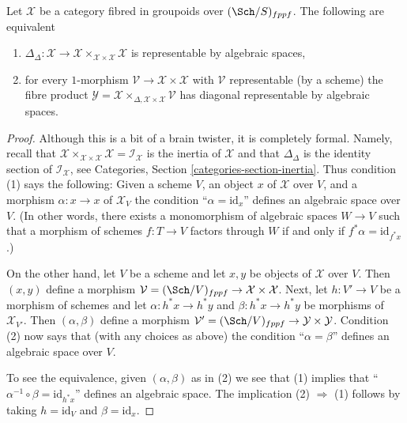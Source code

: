 \begin{lemma}
\label{lemma-second-diagonal}
Let $\mathcal{X}$ be a category fibred in groupoids over $(\Sch/S)_{fppf}$.
The following are equivalent
\begin{enumerate}
\item $\Delta_\Delta : \mathcal{X} \to
\mathcal{X} \times_{\mathcal{X} \times \mathcal{X}} \mathcal{X}$
is representable by algebraic spaces,
\item for every $1$-morphism $\mathcal{V} \to \mathcal{X} \times \mathcal{X}$
with $\mathcal{V}$ representable (by a scheme) the fibre product
$\mathcal{Y} =
\mathcal{X} \times_{\Delta, \mathcal{X} \times \mathcal{X}} \mathcal{V}$
has diagonal representable by algebraic spaces.
\end{enumerate}
\end{lemma}

\begin{proof}
Although this is a bit of a brain twister, it is completely formal.
Namely, recall that
$\mathcal{X} \times_{\mathcal{X} \times \mathcal{X}} \mathcal{X} =
\mathcal{I}_\mathcal{X}$ is the inertia of $\mathcal{X}$ and that
$\Delta_\Delta$ is the identity section of $\mathcal{I}_\mathcal{X}$, see
Categories, Section \ref{categories-section-inertia}.
Thus condition (1) says the following: Given a scheme $V$, an object $x$ of
$\mathcal{X}$ over $V$, and a morphism $\alpha : x \to x$ of $\mathcal{X}_V$
the condition ``$\alpha = \text{id}_x$'' defines an algebraic space over $V$.
(In other words, there exists a monomorphism of algebraic spaces $W \to V$
such that a morphism of schemes $f : T \to V$ factors through $W$
if and only if $f^*\alpha = \text{id}_{f^*x}$.)

\medskip\noindent
On the other hand, let $V$ be a scheme and let $x, y$ be objects of
$\mathcal{X}$ over $V$. Then $(x, y)$ define a morphism
$\mathcal{V} = (\Sch/V)_{fppf} \to \mathcal{X} \times \mathcal{X}$.
Next, let $h : V' \to V$ be a morphism of schemes and let
$\alpha : h^*x \to h^*y$ and $\beta : h^*x \to h^*y$ be morphisms
of $\mathcal{X}_{V'}$. Then $(\alpha, \beta)$ define a morphism
$\mathcal{V}' = (\Sch/V)_{fppf} \to \mathcal{Y} \times \mathcal{Y}$.
Condition (2) now says that (with any choices as above) the
condition ``$\alpha = \beta$'' defines an algebraic space over $V$.

\medskip\noindent
To see the equivalence, given $(\alpha, \beta)$ as in (2) we see that
(1) implies that ``$\alpha^{-1} \circ \beta = \text{id}_{h^*x}$''
defines an algebraic space. The implication (2) $\Rightarrow$ (1)
follows by taking $h = \text{id}_V$ and $\beta = \text{id}_x$.
\end{proof}











